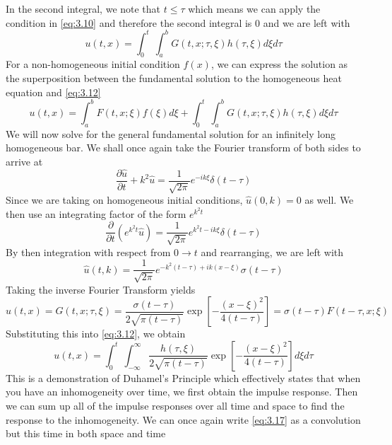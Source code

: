 \documentclass{article}
\newcommand{\pd}[2]{\frac{\partial #1}{\partial #2}}
\newcommand{\pull}{\! \! \!}
\newcommand{\gfsh}{G(t,x;\tau,\xi)}
\numberwithin{equation}{section}
\begin{document}
In the second integral, we note that $t \leq \tau$ which means we can apply the condition in \eqref{eq:3.10} and therefore the second integral is 0 and we are left with 
\begin{equation}
    u(t,x) =\int^t_0\pull\, \int^b_a \gfsh h(\tau,\xi)d\xi d\tau \label{eq:3.12}
\end{equation}
For a non-homogeneous initial condition $f(x)$, we can express the solution as the superposition between the fundamental solution to the homogeneous heat equation and \eqref{eq:3.12} 
\begin{equation}
    u(t,x) = \int^b_a F(t,x;\xi)f(\xi) d\xi + \int^t_0\pull\, \int^b_a \gfsh h(\tau,\xi)d\xi d\tau 
\end{equation} 
We will now solve for the general fundamental solution for an infinitely long homogeneous bar. We shall once again take the Fourier transform of both sides to arrive at 
\begin{equation}
    \pd{\hat{u}}{t} +k^2\hat{u} = \frac{1}{\sqrt{2 \pi}}e^{-ik\xi} \delta (t-\tau)
\end{equation}
Since we are taking on homogeneous initial conditions, $\hat{u}(0,k) = 0$ as well. We then use an integrating factor of the form $e^{k^2t}$
\begin{equation*}
    \pd{}{t}\left( e^{k^2t}\hat{u}\right) = \frac{1}{\sqrt{2\pi}}e^{k^2t-ik\xi} \delta(t-\tau)
\end{equation*}
By then integration with respect from $0\rightarrow t$ and rearranging, we are left with 
\begin{equation}
    \hat{u}(t,k)=\frac{1}{\sqrt{2\pi}}e^{-k^2(t-\tau)+ik(x-\xi)}\sigma(t-\tau)
\end{equation}
Taking the inverse Fourier Transform yields
\begin{equation}
    u(t,x)=\gfsh =\frac{\sigma (t-\tau)}{2\sqrt{\pi (t-\tau)}}\exp\left[{\displaystyle{-\frac{(x-\xi)^2}{4(t-\tau)}}}\right] = \sigma(t-\tau)F(t-\tau,x;\xi) 
\end{equation}
Substituting this into \eqref{eq:3.12}, we obtain
\begin{equation}
    u(t,x)=\int^t_0 \pull\,\int_{-\infty}^\infty \frac{h (\tau,\xi)}{2\sqrt{\pi(t-\tau)}}\exp \left[ -\frac{(x-\xi)^2}{4(t-\tau)} \right]d\xi d\tau \label{eq:3.17}
\end{equation}
This is a demonstration of Duhamel's Principle which effectively states that when you have an inhomogeneity over time, we first obtain the impulse response. Then we can sum up all of the impulse responses over all time and space to find the response to the inhomogeneity. We can once again write \eqref{eq:3.17} as a convolution but this time in both space and time
\end{document}
